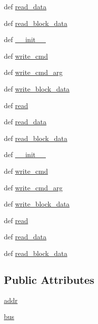 \begin{DoxyCompactItemize}
def \hyperlink{classdriver_1_1i2c__lib_1_1i2c__device_a7960797223c6a315d764f8b1ff11a8f2}{read\+\_\+data}
\item 
def \hyperlink{classdriver_1_1i2c__lib_1_1i2c__device_ad837253a1137bd4ae725f80640ace947}{read\+\_\+block\+\_\+data}
\item 
def \hyperlink{classdriver_1_1i2c__lib_1_1i2c__device_a6f4de0589e9fc9d80dfcbe78764adca6}{\+\_\+\+\_\+init\+\_\+\+\_\+}
\item 
def \hyperlink{classdriver_1_1i2c__lib_1_1i2c__device_a4793439f363c2b22a7f3beae6074f755}{write\+\_\+cmd}
\item 
def \hyperlink{classdriver_1_1i2c__lib_1_1i2c__device_ae998e6b6651a038c5b5466ae941e0eb8}{write\+\_\+cmd\+\_\+arg}
\item 
def \hyperlink{classdriver_1_1i2c__lib_1_1i2c__device_ae270018219f2f96ec9e37e36065d2edc}{write\+\_\+block\+\_\+data}
\item 
def \hyperlink{classdriver_1_1i2c__lib_1_1i2c__device_a9a8d9b4cc3d3890baa0738c9fa60ef4b}{read}
\item 
def \hyperlink{classdriver_1_1i2c__lib_1_1i2c__device_a7960797223c6a315d764f8b1ff11a8f2}{read\+\_\+data}
\item 
def \hyperlink{classdriver_1_1i2c__lib_1_1i2c__device_ad837253a1137bd4ae725f80640ace947}{read\+\_\+block\+\_\+data}
\item 
def \hyperlink{classdriver_1_1i2c__lib_1_1i2c__device_a6f4de0589e9fc9d80dfcbe78764adca6}{\+\_\+\+\_\+init\+\_\+\+\_\+}
\item 
def \hyperlink{classdriver_1_1i2c__lib_1_1i2c__device_a4793439f363c2b22a7f3beae6074f755}{write\+\_\+cmd}
\item 
def \hyperlink{classdriver_1_1i2c__lib_1_1i2c__device_ae998e6b6651a038c5b5466ae941e0eb8}{write\+\_\+cmd\+\_\+arg}
\item 
def \hyperlink{classdriver_1_1i2c__lib_1_1i2c__device_ae270018219f2f96ec9e37e36065d2edc}{write\+\_\+block\+\_\+data}
\item 
def \hyperlink{classdriver_1_1i2c__lib_1_1i2c__device_a9a8d9b4cc3d3890baa0738c9fa60ef4b}{read}
\item 
def \hyperlink{classdriver_1_1i2c__lib_1_1i2c__device_a7960797223c6a315d764f8b1ff11a8f2}{read\+\_\+data}
\item 
def \hyperlink{classdriver_1_1i2c__lib_1_1i2c__device_ad837253a1137bd4ae725f80640ace947}{read\+\_\+block\+\_\+data}
\end{DoxyCompactItemize}
\subsection*{Public Attributes}
\begin{DoxyCompactItemize}
\item 
\hyperlink{classdriver_1_1i2c__lib_1_1i2c__device_a9cfbff86867d526e3bcb5213d80b6f2c}{addr}
\item 
\hyperlink{classdriver_1_1i2c__lib_1_1i2c__device_ac57614bbc2affcaf48f890e8a79c1e96}{bus}
\end{DoxyCompactItemize}


